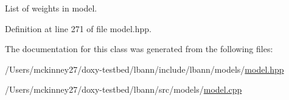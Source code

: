 List of weights in model. 

Definition at line 271 of file model.\+hpp.



The documentation for this class was generated from the following files\+:\begin{DoxyCompactItemize}
\item 
/\+Users/mckinney27/doxy-\/testbed/lbann/include/lbann/models/\hyperlink{model_8hpp}{model.\+hpp}\item 
/\+Users/mckinney27/doxy-\/testbed/lbann/src/models/\hyperlink{model_8cpp}{model.\+cpp}\end{DoxyCompactItemize}
